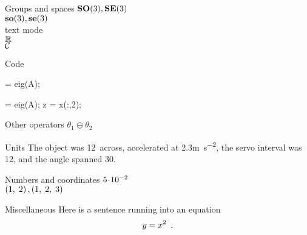 \documentclass{article}
\begin{document}
\begin{exampleA}[righthand width=3.5cm,center lower]{Groups and spaces}
$\mathrm{{\bf SO}(3)}, \mathrm{{\bf SE}(3)}$  \\
$\mathrm{{\bf so}(3)}, \mathrm{{\bf se}(3)}$  \\
text mode  \\
$\mathbb{R}$ \\
${\cal C}$
\end{exampleA}

\begin{exampleA}[righthand width=3.5cm,center lower]{Code}
\begin{Code}
[x,e] = eig(A);
\end{Code}

\begin{CodeNum}
[x,e] = eig(A);
z = x(:,2);
\end{CodeNum}
\end{exampleA}

\begin{exampleA}[righthand width=3.5cm]{Other operators}
$\theta_1 \circleddash \theta_2$ \\
\end{exampleA}

\begin{exampleA}[righthand width=3.5cm]{Units}
The object was 12\mm\ across, 
accelerated at 2.3\unit{m s^{-2}},
the servo interval was 12\ms, 
and the angle spanned 30\deg.
\end{exampleA}

\begin{exampleA}[righthand width=3.5cm,center lower]{Numbers and coordinates}
$\mbox{$5\!\cdot\!10^{-2}$}$  \\
$\left( 1 ,\; 2 \right), \left( 1 ,\; 2 ,\; 3 \right)$
\end{exampleA}

\begin{exampleA}[righthand width=3.5cm]{Miscellaneous}
Here is a sentence running into an equation
\[
y = x^{2} \,\,\,.
\]
\end{exampleA}
\end{document}
